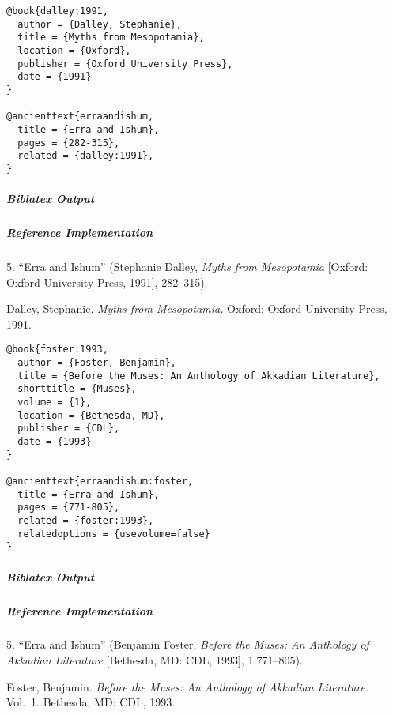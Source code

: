 \documentclass[a4paper]{article}
\newenvironment{biboutput}{%
  \subparagraph{Biblatex Output}
}{\color{black}}
\newenvironment{refimp}{%
  \subparagraph{Reference Implementation}
  \color{reference-colour}
  \rm
}{\par\color{black}}
\begin{document}
\medskip

\begin{lstlisting}
@book{dalley:1991,
  author = {Dalley, Stephanie},
  title = {Myths from Mesopotamia},
  location = {Oxford},
  publisher = {Oxford University Press},
  date = {1991}
}

@ancienttext{erraandishum,
  title = {Erra and Ishum},
  pages = {282-315},
  related = {dalley:1991},
}
\end{lstlisting}

\begin{biboutput}
\end{biboutput}

\begin{refimp}
  \hspace*{\bibindent}5. “Erra and Ishum” (Stephanie Dalley, \emph{Myths from
  Mesopotamia} [Oxford: Oxford University Press, 1991], 282–315).
  
  \hangindent\bibindent Dalley, Stephanie. \emph{Myths from Mesopotamia.}
  Oxford: Oxford University Press, 1991.
\end{refimp}

\medskip

\begin{lstlisting}
@book{foster:1993,
  author = {Foster, Benjamin},
  title = {Before the Muses: An Anthology of Akkadian Literature},
  shorttitle = {Muses},
  volume = {1},
  location = {Bethesda, MD},
  publisher = {CDL},
  date = {1993}
}

@ancienttext{erraandishum:foster,
  title = {Erra and Ishum},
  pages = {771-805},
  related = {foster:1993},
  relatedoptions = {usevolume=false}
}
\end{lstlisting}

\begin{biboutput}
\end{biboutput}

\begin{refimp}
  \hspace*{\bibindent}5. “Erra and Ishum” (Benjamin Foster, \emph{Before the
  Muses: An Anthology of Akkadian Literature} [Bethesda, MD: CDL, 1993],
  1:771–805).
  
  \hangindent\bibindent Foster, Benjamin. \emph{Before the Muses: An Anthology of
  Akkadian Literature.} Vol.~1. Bethesda, MD: CDL, 1993.
\end{refimp}
\end{document}
